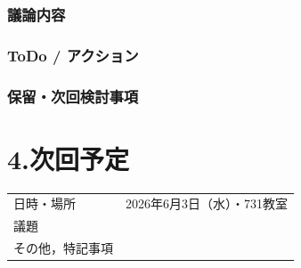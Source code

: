 \documentclass[a4paper,12pt]{ltjsarticle}
\begin{document}
\subsubsection*{議論内容}

\subsubsection*{ToDo / アクション}

\subsubsection*{保留・次回検討事項}

\section*{4.次回予定}
\begin{tabular}{ll}
  \toprule
  日時・場所 & 2026年6月3日（水）・731教室 \\
  議題       &  \\
  その他，特記事項 & \\
  \bottomrule
\end{tabular}
\end{document}
